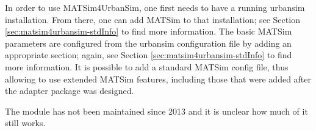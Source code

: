 In order to use MATSim4UrbanSim, one first needs to have a running \acrshort{urbansim} installation.  From there, one can add MATSim to that installation; see Section \ref{sec:matsim4urbansim-stdInfo} to find more information.  The basic MATSim parameters are configured from the \acrshort{urbansim} configuration file by adding an appropriate section; again, see Section \ref{sec:matsim4urbansim-stdInfo} to find more information.  It is possible to add a standard MATSim config file, thus allowing to use extended MATSim features, including those that were added after the adapter package was designed.

The module has not been maintained since 2013 and it is unclear how much of it still works.





